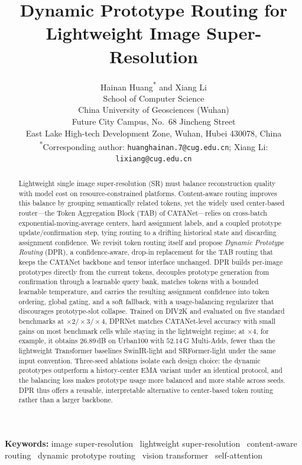 \documentclass[12pt]{article}
\title{\bfseries Dynamic Prototype Routing for Lightweight Image Super-Resolution}
\author{
  Hainan Huang\textsuperscript{*} and Xiang Li\\[4pt]
  \normalsize School of Computer Science\\
  \normalsize China University of Geosciences (Wuhan)\\
  \normalsize Future City Campus, No.\ 68 Jincheng Street\\
  \normalsize East Lake High-tech Development Zone, Wuhan, Hubei 430078, China\\[3pt]
  \small \textsuperscript{*}Corresponding author:
  \texttt{huanghainan.7@cug.edu.cn}; Xiang Li: \texttt{lixiang@cug.edu.cn}
}
\date{}
\begin{document}
\maketitle

\begin{abstract}
\noindent
Lightweight single image super-resolution (SR) must balance reconstruction quality with
model cost on resource-constrained platforms. Content-aware routing improves this balance
by grouping semantically related tokens, yet the widely used center-based router---the
Token Aggregation Block (TAB) of CATANet---relies on cross-batch exponential-moving-average
centers, hard assignment labels, and a coupled prototype update/confirmation step, tying
routing to a drifting historical state and discarding assignment confidence. We revisit
token routing itself and propose \emph{Dynamic Prototype Routing} (DPR), a confidence-aware,
drop-in replacement for the TAB routing that keeps the CATANet backbone and tensor interface
unchanged. DPR builds per-image prototypes directly from the current tokens, decouples
prototype generation from confirmation through a learnable query bank, matches tokens with a
bounded learnable temperature, and carries the resulting assignment confidence into token
ordering, global gating, and a soft fallback, with a usage-balancing regularizer that
discourages prototype-slot collapse. Trained on DIV2K and evaluated on five standard
benchmarks at $\times2/\times3/\times4$, DPRNet matches CATANet-level accuracy with small
gains on most benchmark cells while staying in the lightweight regime; at $\times4$, for
example, it obtains $26.89$\,dB on Urban100 with $52.14$\,G Multi-Adds, fewer than the
lightweight Transformer baselines SwinIR-light and SRFormer-light under the same input
convention. Three-seed ablations isolate each design choice: the dynamic prototypes
outperform a history-center EMA variant under an identical protocol, and the balancing loss
makes prototype usage more balanced and more stable across seeds. DPR thus offers a reusable,
interpretable alternative to center-based token routing rather than a larger backbone.
\end{abstract}

\noindent\textbf{Keywords:} image super-resolution \textperiodcentered\ lightweight
super-resolution \textperiodcentered\ content-aware routing \textperiodcentered\ dynamic
prototype routing \textperiodcentered\ vision transformer \textperiodcentered\ self-attention

\bigskip
\end{document}
